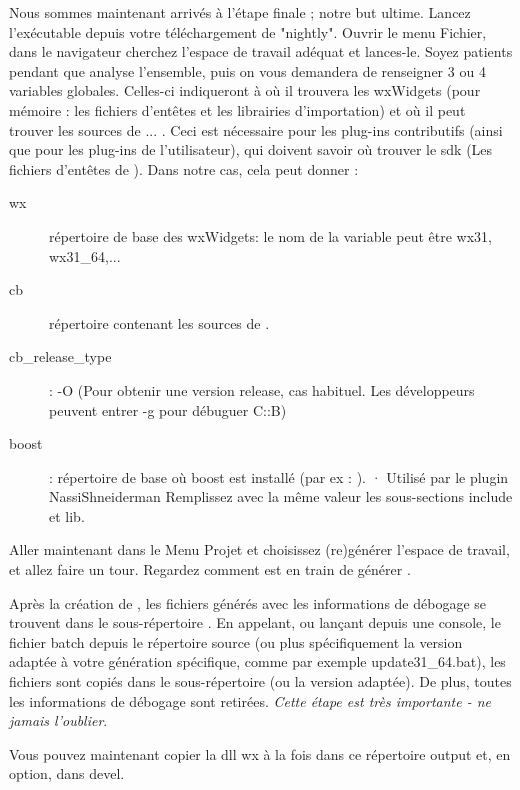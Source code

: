 Nous sommes maintenant arrivés à l'étape finale ; notre but ultime. Lancez l'exécutable \codeblocks depuis votre téléchargement de "nightly". Ouvrir le menu Fichier, dans le navigateur cherchez l'espace de travail adéquat et lances-le. Soyez patients pendant que \codeblocks analyse l'ensemble, puis on vous demandera de renseigner 3 ou 4 variables globales. Celles-ci indiqueront à \codeblocks où il trouvera les wxWidgets (pour mémoire : les fichiers d'entêtes et les librairies d'importation) et où il peut trouver les sources de ... \codeblocks. Ceci est nécessaire pour les plug-ins contributifs (ainsi que pour les plug-ins de l'utilisateur), qui doivent savoir où trouver le sdk (Les fichiers d'entêtes de \codeblocks). Dans notre cas, cela peut donner :
\begin{description}
\item[wx]  répertoire de base des wxWidgets: le nom de la variable peut être wx31, wx31\_64,...
\item[cb]  répertoire contenant les sources de \codeblocks.
\item[cb\_release\_type] : -O (Pour obtenir une version release, cas habituel.
         Les développeurs peuvent entrer -g pour débuguer C::B)
\item[boost] : répertoire de base où boost est installé (par ex : ).
·         Utilisé par le plugin NassiShneiderman
          Remplissez avec la même valeur les sous-sections include et lib.
\end{description}

Aller maintenant dans le Menu Projet et choisissez (re)générer l'espace de travail, et allez faire un tour. Regardez comment \codeblocks est en train de générer \codeblocks.

Après la création de \codeblocks, les fichiers générés avec les informations de débogage se trouvent dans le sous-répertoire . En appelant, ou lançant depuis une console, le fichier batch  depuis le répertoire source  (ou plus spécifiquement la version adaptée à votre génération spécifique, comme par exemple update31\_64.bat), les fichiers sont copiés dans le sous-répertoire  (ou la version adaptée). De plus, toutes les informations de débogage sont retirées. \textit{Cette étape est très importante - ne jamais l'oublier}.

Vous pouvez maintenant copier la dll wx à la fois dans ce répertoire output et, en option, dans devel.

